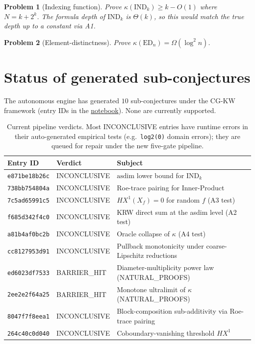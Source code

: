 \documentclass[11pt,a4paper]{article}
\newtheorem{problem}{Problem}
\begin{document}
\begin{problem}[Indexing function]
Prove $\kappa(\mathrm{IND}_k) \geq k - O(1)$ where $N = k + 2^k$. The
formula depth of $\mathrm{IND}_k$ is $\Theta(k)$, so this would match
the true depth up to a constant via A1.
\end{problem}

\begin{problem}[Element-distinctness]
Prove $\kappa(\mathrm{ED}_n) = \Omega(\log^2 n)$.
\end{problem}

\section{Status of generated sub-conjectures}\label{sec:status}

The autonomous engine has generated $10$ sub-conjectures under the CG-KW
framework (entry IDs in the
\href{https://github.com/ludwigkubler/SperimentalMath/blob/main/notebook}{notebook}).
None are currently supported.

\begin{table}[h]
\centering
\small
\begin{tabular}{l l l}
\toprule
Entry ID & Verdict & Subject \\
\midrule
\texttt{e871be18b26c} & INCONCLUSIVE & $\mathrm{asdim}$ lower bound for $\mathrm{IND}_k$ \\
\texttt{738bb754804a} & INCONCLUSIVE & Roe-trace pairing for Inner-Product \\
\texttt{7c5ad65991c5} & INCONCLUSIVE & $HX^1(X_f) = 0$ for random $f$ (A3 test) \\
\texttt{f685d342f4c0} & INCONCLUSIVE & KRW direct sum at the asdim level (A2 test) \\
\texttt{a81b4af0bc2b} & INCONCLUSIVE & Oracle collapse of $\kappa$ (A4 test) \\
\texttt{cc8127953d91} & INCONCLUSIVE & Pullback monotonicity under coarse-Lipschitz reductions \\
\texttt{ed6023df7533} & BARRIER\_HIT & Diameter-multiplicity power law (NATURAL\_PROOFS) \\
\texttt{2ee2e2f64a25} & BARRIER\_HIT & Monotone ultralimit of $\kappa$ (NATURAL\_PROOFS) \\
\texttt{8047f7f8eea1} & INCONCLUSIVE & Block-composition sub-additivity via Roe-trace pairing \\
\texttt{264c40c0d040} & INCONCLUSIVE & Coboundary-vanishing threshold $HX^1$ \\
\bottomrule
\end{tabular}
\caption{Current pipeline verdicts. Most INCONCLUSIVE entries have
runtime errors in their auto-generated empirical tests
(e.g.\ \texttt{log2(0)} domain errors); they are queued for repair under
the new five-gate pipeline.}
\label{tab:status}
\end{table}
\end{document}
